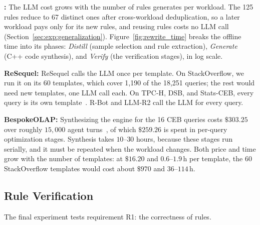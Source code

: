\textbf{{\sys}:} The LLM cost grows with the number of rules {\sys} generates per workload. The 125 rules reduce to 67 distinct ones after cross-workload deduplication, so a later workload pays only for its new rules, and reusing rules costs no LLM call (Section~\ref{sec:exp:generalization}). Figure~\ref{fig:rewrite_time} breaks the offline time into its phases: \emph{Distill} (sample selection and rule extraction), \emph{Generate} (C++ code synthesis), and \emph{Verify} (the verification stages), in log scale. 

\textbf{ReSequel:} ReSequel calls the LLM once per template. On \textsf{StackOverflow}, we run it on its 60 templates, which cover 1,190 of the 18,251 queries; the rest would need  new templates, one LLM call each. On \textsf{TPC-H}, \textsf{DSB}, and \textsf{Stats-CEB}, every query is its own template~\cite{resequel}. R-Bot and LLM-R2 call the LLM for every query.

\textbf{BespokeOLAP:} Synthesizing the engine for the 16 \textsf{CEB} queries costs $\$303.25$ over roughly $15{,}000$ agent turns~\cite{bespokeolap}, of which $\$259.26$ is spent in per-query optimization stages. Synthesis takes $10$--$30$ hours, because these stages run serially, and it must be repeated when the workload changes. Both price and time grow with the number of templates: at $\$16.20$ and $0.6$--$1.9$\,h per template, the 60 \textsf{StackOverflow} templates would cost about $\$970$ and $36$--$114$\,h.


\subsection{Rule Verification}
\label{sec:exp:verification}
The final experiment tests requirement R1: the correctness of rules.

